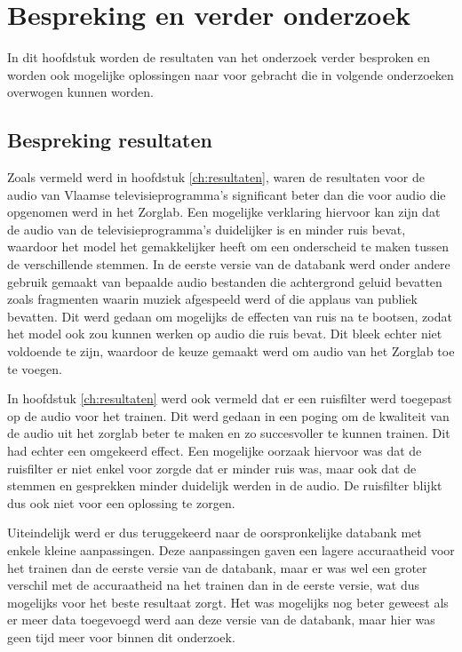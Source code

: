 
\chapter{Bespreking en verder onderzoek}
\label{ch:bespreking}
In dit hoofdstuk worden de resultaten van het onderzoek verder besproken en worden ook mogelijke oplossingen naar voor gebracht die in volgende onderzoeken overwogen kunnen worden.

\section{Bespreking resultaten}
\label{sec:bespr-res}
Zoals vermeld werd in hoofdstuk \ref{ch:resultaten}, waren de resultaten voor de audio van Vlaamse televisieprogramma's significant beter dan die voor audio die opgenomen werd in het Zorglab. Een mogelijke verklaring hiervoor kan zijn dat de audio van de televisieprogramma's duidelijker is en minder ruis bevat, waardoor het model het gemakkelijker heeft om een onderscheid te maken tussen de verschillende stemmen. In de eerste versie van de databank werd onder andere gebruik gemaakt van bepaalde audio bestanden die achtergrond geluid bevatten zoals fragmenten waarin muziek afgespeeld werd of die applaus van publiek bevatten. Dit werd gedaan om mogelijks de effecten van ruis na te bootsen, zodat het model ook zou kunnen werken op audio die ruis bevat. Dit bleek echter niet voldoende te zijn, waardoor de keuze gemaakt werd om audio van het Zorglab toe te voegen.

In hoofdstuk \ref{ch:resultaten} werd ook vermeld dat er een ruisfilter werd toegepast op de audio voor het trainen. Dit werd gedaan in een poging om de kwaliteit van de audio uit het zorglab beter te maken en zo succesvoller te kunnen trainen. Dit had echter een omgekeerd effect. Een mogelijke oorzaak hiervoor was dat de ruisfilter er niet enkel voor zorgde dat er minder ruis was, maar ook dat de stemmen en gesprekken minder duidelijk werden in de audio. De ruisfilter blijkt dus ook niet voor een oplossing te zorgen.

Uiteindelijk werd er dus teruggekeerd naar de oorspronkelijke databank met enkele kleine aanpassingen. Deze aanpassingen gaven een lagere accuraatheid voor het trainen dan de eerste versie van de databank, maar er was wel een groter verschil met de accuraatheid na het trainen dan in de eerste versie, wat dus mogelijks voor het beste resultaat zorgt. Het was mogelijks nog beter geweest als er meer data toegevoegd werd aan deze versie van de databank, maar hier was geen tijd meer voor binnen dit onderzoek. 

